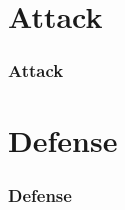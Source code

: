 \documentclass[9pt]{beamer}
\begin{document}
\section{Attack}

\begin{frame}
  \frametitle{Attack}
\end{frame}

\section{Defense}

\begin{frame}
  \frametitle{Defense}
\end{frame}
\end{document}
